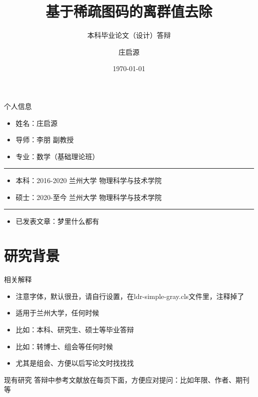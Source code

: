 \documentclass{ldr-simple-gray}
\title{基于稀疏图码的离群值去除}
\subtitle{本科毕业论文（设计）答辩}
\author{庄启源}
\institute[]
{
导师：李朋\quad 副教授\\
兰州大学\quad 数学与统计学院
}
\date{\today}
\begin{document}
\frame{\titlepage}


\begin{frame}{个人信息}

    \begin{itemize}
        \item 姓名：庄启源
        \item 导师：李朋 副教授
        \item 专业：数学（基础理论班）
    \end{itemize}

    \qquad \noindent\rule[0.25\baselineskip]{0.9\textwidth}{1pt}

    \begin{itemize}
        \item 本科：2016-2020 \quad 兰州大学 \quad 物理科学与技术学院
        \item 硕士：2020-至今 \quad 兰州大学 \quad 物理科学与技术学院
    \end{itemize}

    \qquad \noindent\rule[0.25\baselineskip]{0.9\textwidth}{1pt}

    \begin{itemize}
        \item 已发表文章：梦里什么都有 ~
    \end{itemize}
\end{frame}


\section{研究背景}

\begin{frame}{相关解释}
    \begin{itemize}
        \item 注意字体，默认很丑，请自行设置，在ldr-simple-gray.cls文件里，注释掉了
        \item 适用于兰州大学，任何时候
        \item 比如：本科、研究生、硕士等毕业答辩
        \item 比如：转博士、组会等任何时候
        \item 尤其是组会、方便以后写论文时找找找
    \end{itemize}
    
\end{frame}


\begin{frame}{现有研究}
    答辩中参考文献放在每页下面，方便应对提问：比如年限、作者、期刊等
    \begin{figure}
         \\
    \end{figure}
\end{frame}
\end{document}
